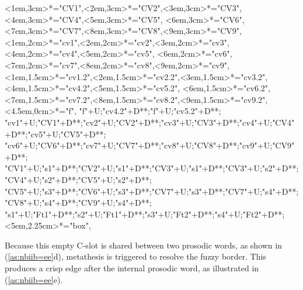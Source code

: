 \begin{multicols}{2}
\begin{exe}
{\begin{xlist}
{		<1em,3cm>*="CV1",<2em,3cm>*="CV2",<3em,3cm>*="CV3",<4em,3cm>*="CV4",<5em,3cm>*="CV5",
		<6em,3cm>*="CV6",<7em,3cm>*="CV7",<8em,3cm>*="CV8",<9em,3cm>*="CV9",
		<1em,2cm>*="cv1",<2em,2cm>*="cv2",<3em,2cm>*="cv3",<4em,2cm>*="cv4",<5em,2cm>*\as{\0}="cv5",
		<6em,2cm>*="cv6",<7em,2cm>*\as{ }="cv7",<8em,2cm>*="cv8",<9em,2cm>*\as{ }="cv9",
		<1em,1.5cm>*="cv1.2",<2em,1.5cm>*="cv2.2",<3em,1.5cm>*="cv3.2",<4em,1.5cm>*="cv4.2",<5em,1.5cm>*\as{\0}="cv5.2",
		<6em,1.5cm>*="cv6.2",<7em,1.5cm>*\as{ }="cv7.2",<8em,1.5cm>*="cv8.2",<9em,1.5cm>*\as{ }="cv9.2",
		<4.5em,0cm>*="f",
		"f"+U;"cv4.2"+D**\dir{-};"f"+U;"cv5.2"+D**\dir{-};
		"cv1"+U;"CV1"+D**\dir{-};"cv2"+U;"CV2"+D**\dir{-};"cv3"+U;"CV3"+D**\dir{-};"cv4"+U;"CV4"+D**\dir{-};"cv5"+U;"CV5"+D**\dir{-};
		"cv6"+U;"CV6"+D**\dir{-};"cv7"+U;"CV7"+D**\dir{};"cv8"+U;"CV8"+D**\dir{-};"cv9"+U;"CV9"+D**\dir{};
		"CV1"+U;"s1"+D**\dir{-};"CV2"+U;"s1"+D**\dir{-};"CV3"+U;"s1"+D**\dir{-};"CV3"+U;"s2"+D**\dir{-};"CV4"+U;"s2"+D**\dir{-};"CV5"+U;"s2"+D**\dir{-};
		"CV5"+U;"s3"+D**\dir{-};"CV6"+U;"s3"+D**\dir{-};"CV7"+U;"s3"+D**\dir{-};"CV7"+U;"s4"+D**\dir{-};"CV8"+U;"s4"+D**\dir{-};"CV9"+U;"s4"+D**\dir{-};
		"s1"+U;"Ft1"+D**\dir{-};"s2"+U;"Ft1"+D**\dir{-};"s3"+U;"Ft2"+D**\dir{-};"s4"+U;"Ft2"+D**\dir{-};
		<5em,2.25cm>*="box",
	\endxy}\label{as:nbiib=ee2}
	\end{xlist}}
\end{exe}
\end{multicols}

Because this empty C-slot is shared between two prosodic words,
as shown in (\ref{as:nbiib=ee}d),
metathesis is triggered to resolve the fuzzy border.
This produces a crisp edge after the internal prosodic word,
as illustrated in (\ref{as:nbiib=ee}e).

